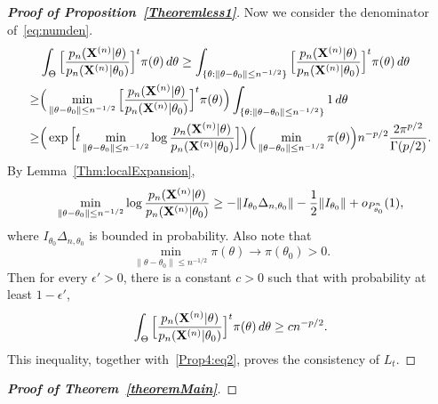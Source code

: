 \documentclass[11pt]{article}
\theoremstyle{plain}
\theoremstyle{definition}
\theoremstyle{remark}
\begin{document}
\begin{appendices}
\begin{proof}[\textbf{Proof of Proposition~\ref{Theoremless1}}]
    Now we consider the denominator of~\eqref{eq:numden}.
    $$
    \begin{aligned}
        & \int_{\Theta}\Big[\frac{p_n(\mathbf{X}^{(n)}|\theta)}{p_n(\mathbf{X}^{(n)}|\theta_0)}\Big]^{t} \pi(\theta)\, d\theta
        \geq
        \int_{\{\theta:\|\theta-\theta_0\|\leq n^{-1/2}\}}\Big[\frac{p_n(\mathbf{X}^{(n)}|\theta)}{p_n(\mathbf{X}^{(n)}|\theta_0)}\Big]^{t} \pi(\theta)\, d\theta
        \\
        \geq &
        \Big(
        \min_{\|\theta-\theta_0\|\leq n^{-1/2}} 
\Big[\frac{p_n(\mathbf{X}^{(n)}|\theta)}{p_n(\mathbf{X}^{(n)}|\theta_0)}\Big]^{t} \pi(\theta)
        \Big)
        \int_{\{\theta:\|\theta-\theta_0\|\leq n^{-1/2}\}}1\, d\theta\\
        \geq&
        \Big(
        \exp
\Big[
        t\min_{\|\theta-\theta_0\|\leq n^{-1/2}} 
        \log\frac{p_n(\mathbf{X}^{(n)}|\theta)}{p_n(\mathbf{X}^{(n)}|\theta_0)}
        \Big]
        \Big)
        \Big(\min_{\|\theta-\theta_0\|\leq n^{-1/2}} 
        \pi(\theta)
        \Big)
        n^{-p/2}\frac{2\pi^{p/2}}{\Gamma(p/2)}.
    \end{aligned}
    $$
    By Lemma~\ref{Thm:localExpansion},
    $$
   \begin{aligned} 
        \min_{\|\theta-\theta_0\|\leq n^{-1/2}} 
        \log\frac{p_n(\mathbf{X}^{(n)}|\theta)}{p_n(\mathbf{X}^{(n)}|\theta_0)}
        \geq
        -\|I_{\theta_0}\Delta_{n,\theta_0}\|-\frac{1}{2}\|I_{\theta_0}\|+
        o_{P^n_{\theta_0}}(1),
   \end{aligned}
    $$
    where
    $I_{\theta_0}\Delta_{n,\theta_0}$
    is bounded in probability.
    Also note that 
    $$\min_{\|\theta-\theta_0\|\leq n^{-1/2}} \pi(\theta)\to \pi(\theta_0)>0.$$
    Then for every $\epsilon'>0$, there is a constant $c>0$ such that with probability at least $1-\epsilon'$,
    $$
         \int_{\Theta}\Big[\frac{p_n(\mathbf{X}^{(n)}|\theta)}{p_n(\mathbf{X}^{(n)}|\theta_0)}\Big]^{t} \pi(\theta)\, d\theta\geq c n^{-p/2}.
    $$
    This inequality, together with~\eqref{Prop4:eq2}, proves the consistency of $L_t$.
\end{proof}



\begin{proof}[\textbf{Proof of Theorem~\ref{theoremMain}}]



\end{proof}
\end{appendices}
\end{document}
